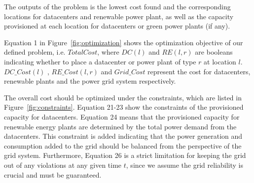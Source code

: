 
The outputs of the problem is the lowest cost found and the corresponding locations for datacenters and renewable power plant, as well as the capacity provisioned at each location for datacenters or green power plants (if any).

Equation 1 in Figure~\ref{fig:optimization} shows the optimization objective of our defined problem, i.e. $TotalCost$, where $DC(l)$ and $RE(l,r)$ are booleans indicating whether to place a datacenter or power plant of type $r$ at location $l$. $DC\_Cost(l)$ , $RE\_Cost(l,r)$ and $Grid\_Cost$ represent the cost for datacenters, renewable plants and the power grid system respectively.


The overall cost should be optimized under the constraints, which are listed in Figure~\ref{fig:constraints}. Equation 21-23 show the constraints of the provisioned capacity for datacenters. Equation 24 means that the provisioned capacity for renewable energy plants are determined by the total power demand from the datacenters. This constraint is added indicating that the power generation and consumption added to the grid should be balanced from the perspective of the grid system. Furthermore, Equation 26
is a strict limitation for keeping the grid out of any violations at any given time $t$, since we assume the grid reliability is crucial and must be guaranteed.

